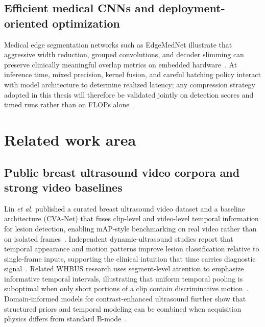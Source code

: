 \documentclass[
english,                 %
bibtex,                  %
]{kththesis}
\numberwithin{listing}{chapter}
\begin{document}
\subsection{Efficient medical CNNs and deployment-oriented optimization}
Medical edge segmentation networks such as EdgeMedNet illustrate that aggressive width reduction, grouped convolutions, and decoder slimming can preserve clinically meaningful overlap metrics on embedded hardware~\cite{liu2023_edgemednet}.
At inference time, mixed precision, kernel fusion, and careful batching policy interact with model architecture to determine realized latency; any compression strategy adopted in this thesis will therefore be validated jointly on detection scores and timed runs rather than on FLOPs alone~\cite{liu2023_edgemednet}.

\section{Related work area}

\subsection{Public breast ultrasound video corpora and strong video baselines}
Lin \emph{et al.} published a curated breast ultrasound video dataset and a baseline architecture (CVA-Net) that fuses clip-level and video-level temporal information for lesion detection, enabling mAP-style benchmarking on real video rather than on isolated frames~\cite{lin2022_buv_miccai}.
Independent dynamic-ultrasound studies report that temporal appearance and motion patterns improve lesion classification relative to single-frame inputs, supporting the clinical intuition that time carries diagnostic signal~\cite{zhao2023_dynamic_us_video}.
Related WHBUS research uses segment-level attention to emphasize informative temporal intervals, illustrating that uniform temporal pooling is suboptimal when only short portions of a clip contain discriminative motion~\cite{zhang2024_whbus_isbi}.
Domain-informed models for contrast-enhanced ultrasound further show that structured priors and temporal modeling can be combined when acquisition physics differs from standard B-mode~\cite{chen2021_ceus_domain}.
\end{document}
